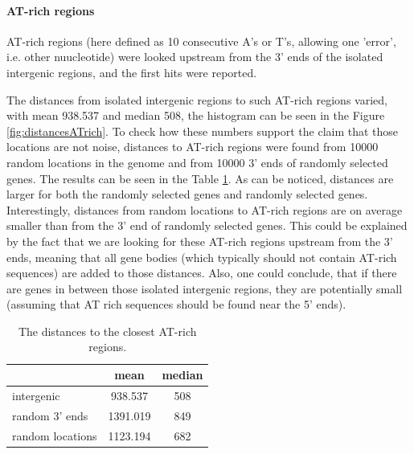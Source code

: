\paragraph{AT-rich regions}

AT-rich regions (here defined as 10 consecutive A's or T's, allowing one 'error', i.e. other nuucleotide)
were looked upstream from the 3' ends of the isolated intergenic regions, and the first hits were reported.

The distances from isolated intergenic regions to such AT-rich regions varied,
with mean 938.537 and median 508, the histogram can be seen in the Figure \ref{fig:distancesATrich}.
To check how these numbers support the claim that those locations are not noise,
distances to AT-rich regions were found from 10000 random locations in the genome and from 10000 3' ends of randomly selected genes.
The results can be seen in the Table \ref{tab:distancesATrich}.
As can be noticed, distances are larger for both the randomly selected genes and randomly selected genes.
Interestingly, distances from random locations to AT-rich regions are on average smaller than from the 3' end of randomly selected genes.
This could be explained by the fact that we are looking for these AT-rich regions upstream from the 3' ends,
meaning that all gene bodies (which typically should not contain AT-rich sequences) are added to those distances.
Also, one could conclude, that if there are genes in between those isolated intergenic regions,
they are potentially small (assuming that AT rich sequences should be found near the 5' ends).

\begin{table}[htbp]
  \centering
  \begin{tabular}{l|cc}
    \toprule
     & mean & median  \\
    \midrule
    intergenic & 938.537 & 508 \\
    random 3' ends & 1391.019 & 849 \\
    random locations & 1123.194 & 682 \\
    \bottomrule
  \end{tabular}
  \caption{The distances to the closest AT-rich regions.}
  \label{tab:distancesATrich}
\end{table}

